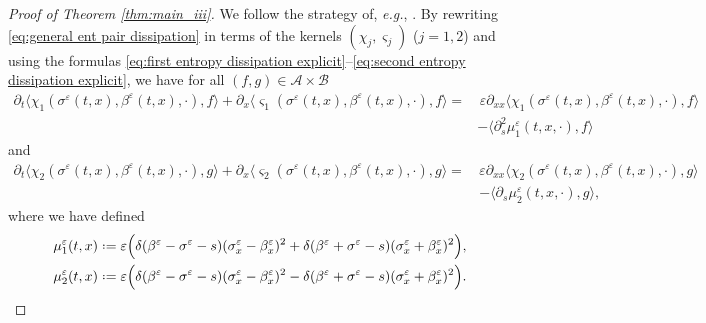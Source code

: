 \documentclass[11pt,a4paper,reqno]{amsart}
\numberwithin{equation}{section}
\theoremstyle{definition}
\theoremstyle{remark}
\newcommand*{\defeq}{\mathrel{\vcenter{\baselineskip0.5ex \lineskiplimit0pt
                     \hbox{\scriptsize.}\hbox{\scriptsize.}}}%
                     =}
\begin{document}
{\begin{proof}[Proof of Theorem \ref{thm:main_iii}]
We follow the strategy of, \textit{e.g.}, \cite[\S 6]{Matthew}. By rewriting \eqref{eq:general ent pair dissipation} in terms of the kernels $(\chi_j,\varsigma_j)$ ($j=1,2$) and using the formulas \eqref{eq:first entropy dissipation explicit}--\eqref{eq:second entropy dissipation explicit}, we have for all $(f,g) \in \mathcal{A}\times\mathcal{B}$ 
    \begin{equation}\label{eq:dissipations in terms ofkernel 1}
       \begin{aligned} \partial_t\langle \chi_1(\sigma^\varepsilon(t,x),\beta^\varepsilon(t,x),\cdot) , f \rangle + \partial_x \langle \varsigma_1(\sigma^\varepsilon(t,x),\beta^\varepsilon(t,x),\cdot) , f \rangle = & \, \varepsilon \partial_{xx}\langle \chi_1(\sigma^\varepsilon(t,x),\beta^\varepsilon(t,x),\cdot),f \rangle \\ 
       &- \langle \partial^2_s\mu_1^\varepsilon(t,x,\cdot) , f \rangle 
       \end{aligned}
    \end{equation}
    and 
        \begin{equation}\label{eq:dissipations in terms ofkernel 2}
       \begin{aligned} \partial_t\langle \chi_2(\sigma^\varepsilon(t,x),\beta^\varepsilon(t,x),\cdot) , g \rangle + \partial_x \langle \varsigma_2(\sigma^\varepsilon(t,x),\beta^\varepsilon(t,x),\cdot) , g \rangle = \, &\varepsilon \partial_{xx}\langle \chi_2(\sigma^\varepsilon(t,x),\beta^\varepsilon(t,x),\cdot),g \rangle \\ 
       &- \langle \partial_s\mu_2^\varepsilon(t,x,\cdot) , g \rangle, 
       \end{aligned}
    \end{equation}
    where we have defined 
    \begin{equation}\label{eq:dissipations defis}
        \begin{aligned}
            &\mu_1^\varepsilon(t,x) \defeq \varepsilon \Big( \delta(\beta^\varepsilon-\sigma^\varepsilon-s) (\sigma^\varepsilon_x - \beta^\varepsilon_x)^2 + \delta(\beta^\varepsilon+\sigma^\varepsilon-s) (\sigma^\varepsilon_x + \beta^\varepsilon_x)^2 \Big), \\ 
            &\mu_2^\varepsilon(t,x) \defeq \varepsilon \Big(\delta(\beta^\varepsilon-\sigma^\varepsilon-s) (\sigma^\varepsilon_x - \beta^\varepsilon_x)^2 -\delta(\beta^\varepsilon+\sigma^\varepsilon-s) (\sigma^\varepsilon_x + \beta^\varepsilon_x)^2 \Big). 

\end{aligned}
\end{equation}
\end{proof}}
\end{document}
